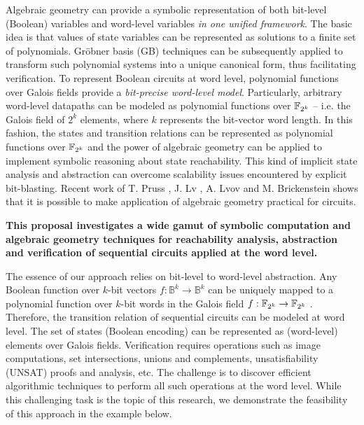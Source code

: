 Algebraic geometry can provide a symbolic representation of both bit-level (Boolean) variables and 
word-level variables \textit{in one unified framework}. The basic idea is that values of state variables can be represented as solutions to a 
finite set of polynomials. Gr\"obner basis (GB) techniques can be subsequently
applied to transform such polynomial systems into a unique canonical form, thus facilitating verification.
To represent Boolean circuits at word level, polynomial functions over Galois fields provide a {\it bit-precise
word-level model}.
Particularly, arbitrary word-level datapaths can be modeled as polynomial
functions over ${\mathbb{F}}_{2^k}$ -- i.e. the Galois field of $2^k$ elements, where $k$ represents the bit-vector word length. In this fashion,
the states and transition relations can be represented as polynomial functions over ${\mathbb{F}}_{2^k}$ and the power of algebraic geometry can be applied to
implement symbolic reasoning about state reachability. This kind of implicit state
analysis and abstraction can overcome scalability issues encountered by explicit bit-blasting.
Recent work of T. Pruss \cite{timDAC}, J. Lv \cite{jinpeng}, A. Lvov \cite{BLUEVERI} and M. Brickenstein \cite{PolyBoRi}
shows that it is possible to make application of algebraic geometry practical for circuits.

\textbf{This proposal investigates a wide gamut of symbolic computation and algebraic geometry techniques for reachability analysis, abstraction and
verification of sequential circuits applied at the word level.}


The essence of our approach relies on  bit-level to word-level abstraction.
Any Boolean function over $k$-bit vectors $f:\mathbb B^k\to \mathbb B^k$ 
can be uniquely mapped to a polynomial function over $k$-bit words in the Galois field $f:{\mathbb{F}}_{2^k} \to {\mathbb{F}}_{2^k}$ \cite{timDAC}. 
Therefore, the transition relation of sequential circuits can be modeled at word level. The set of
states (Boolean encoding) can be represented as (word-level) elements over Galois fields. Verification
requires operations such as image computations, set intersections, unions and complements, unsatisfiability 
(UNSAT) proofs and analysis, etc. The challenge is to discover efficient algorithmic techniques to perform all such 
operations at the word level. While this challenging task is the topic of this research, we
demonstrate the feasibility of this approach in the example below.

